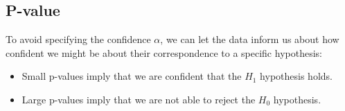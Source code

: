 \subsection{P-value}
To avoid specifying the confidence $\alpha$, we can let the data inform us about how confident we might be about their correspondence to a specific hypothesis:
\begin{itemize}
    \item Small p-values imply that we are confident that the $H_1$ hypothesis holds. 
    \item Large p-values imply that we are not able to reject the $H_0$ hypothesis.
\end{itemize}